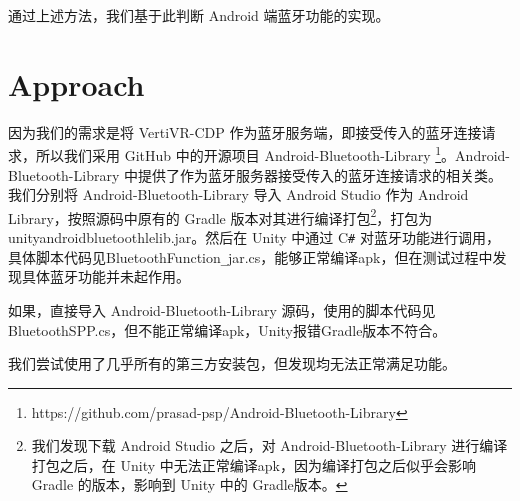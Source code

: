 \documentclass[a4paper,10pt]{article}
\begin{document}
	通过上述方法，我们基于此判断 Android 端蓝牙功能的实现。
	
	\section*{Approach}
	
	因为我们的需求是将 VertiVR-CDP 作为蓝牙服务端，即接受传入的蓝牙连接请求，所以我们采用 GitHub 中的开源项目 Android-Bluetooth-Library \footnote{https://github.com/prasad-psp/Android-Bluetooth-Library}。Android-Bluetooth-Library 中提供了作为蓝牙服务器接受传入的蓝牙连接请求的相关类。我们分别将 Android-Bluetooth-Library 导入 Android Studio 作为 Android Library，按照源码中原有的 Gradle 版本对其进行编译打包\footnote{我们发现下载 Android Studio 之后，对 Android-Bluetooth-Library 进行编译打包之后，在 Unity 中无法正常编译apk，因为编译打包之后似乎会影响 Gradle 的版本，影响到 Unity 中的 Gradle版本。}，打包为 unityandroidbluetoothlelib.jar。然后在 Unity 中通过 C\texttt{\#} 对蓝牙功能进行调用，具体脚本代码见BluetoothFunction\texttt{\_}jar.cs，能够正常编译apk，但在测试过程中发现具体蓝牙功能并未起作用。
	
	如果，直接导入 Android-Bluetooth-Library 源码，使用的脚本代码见BluetoothSPP.cs，但不能正常编译apk，Unity报错Gradle版本不符合。
	
	我们尝试使用了几乎所有的第三方安装包，但发现均无法正常满足功能。
		
		
		
		
			
			
			
			
			
			
		
%		
%		
		
		
	
\end{document}
